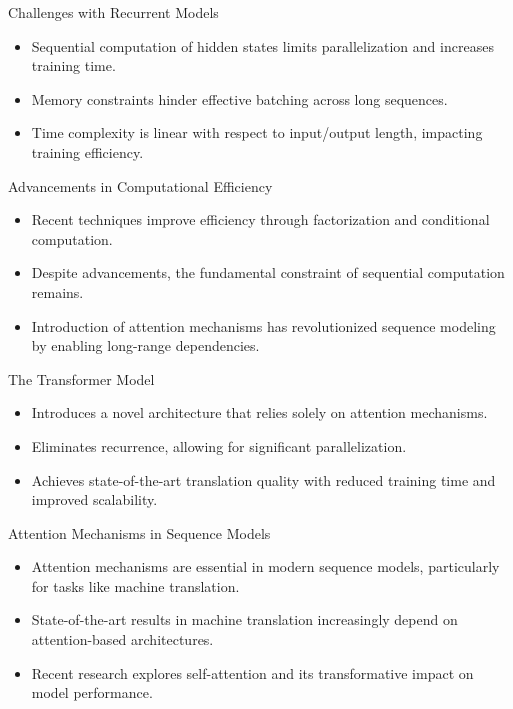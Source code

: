 \documentclass{beamer}
\begin{document}
\begin{frame}{Challenges with Recurrent Models}
\begin{itemize}
\item Sequential computation of hidden states limits parallelization and increases training time.
\item Memory constraints hinder effective batching across long sequences.
\item Time complexity is linear with respect to input/output length, impacting training efficiency.
\end{itemize}
\end{frame}

\begin{frame}{Advancements in Computational Efficiency}
\begin{itemize}
\item Recent techniques improve efficiency through factorization and conditional computation.
\item Despite advancements, the fundamental constraint of sequential computation remains.
\item Introduction of attention mechanisms has revolutionized sequence modeling by enabling long-range dependencies.
\end{itemize}
\end{frame}

\begin{frame}{The Transformer Model}
\begin{itemize}
\item Introduces a novel architecture that relies solely on attention mechanisms.
\item Eliminates recurrence, allowing for significant parallelization.
\item Achieves state-of-the-art translation quality with reduced training time and improved scalability.
\end{itemize}
\end{frame}

\begin{frame}{Attention Mechanisms in Sequence Models}
\begin{itemize}
\item Attention mechanisms are essential in modern sequence models, particularly for tasks like machine translation.
\item State-of-the-art results in machine translation increasingly depend on attention-based architectures.
\item Recent research explores self-attention and its transformative impact on model performance.
\end{itemize}
\end{frame}
\end{document}
